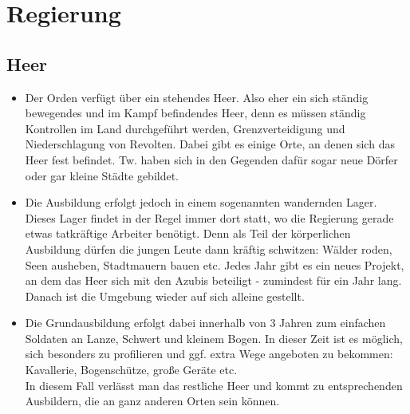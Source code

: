 \chapter{Regierung} \label{ch:regierung}

\section{Heer}
\begin{itemize}
	\item Der Orden verfügt über ein stehendes Heer. Also eher ein sich ständig bewegendes und im Kampf befindendes Heer, denn es müssen ständig Kontrollen im Land durchgeführt werden, Grenzverteidigung und Niederschlagung von Revolten. Dabei gibt es einige Orte, an denen sich das Heer fest befindet. Tw. haben sich in den Gegenden dafür sogar neue Dörfer oder gar kleine Städte gebildet.
	\item Die Ausbildung erfolgt jedoch in einem sogenannten wandernden Lager. Dieses Lager findet in der Regel immer dort statt, wo die Regierung gerade etwas tatkräftige Arbeiter benötigt. Denn als Teil der körperlichen Ausbildung dürfen die jungen Leute dann kräftig schwitzen: Wälder roden, Seen ausheben, Stadtmauern bauen etc. Jedes Jahr gibt es ein neues Projekt, an dem das Heer sich mit den Azubis beteiligt - zumindest für ein Jahr lang. Danach ist die Umgebung wieder auf sich alleine gestellt.
	\item Die Grundausbildung erfolgt dabei innerhalb von 3 Jahren zum einfachen Soldaten an Lanze, Schwert und kleinem Bogen. In dieser Zeit ist es möglich, sich besonders zu profilieren und ggf. extra Wege angeboten zu bekommen: Kavallerie, Bogenschütze, große Geräte etc. \\ In diesem Fall verlässt man das restliche Heer und kommt zu entsprechenden Ausbildern, die an ganz anderen Orten sein können.
\end{itemize}
